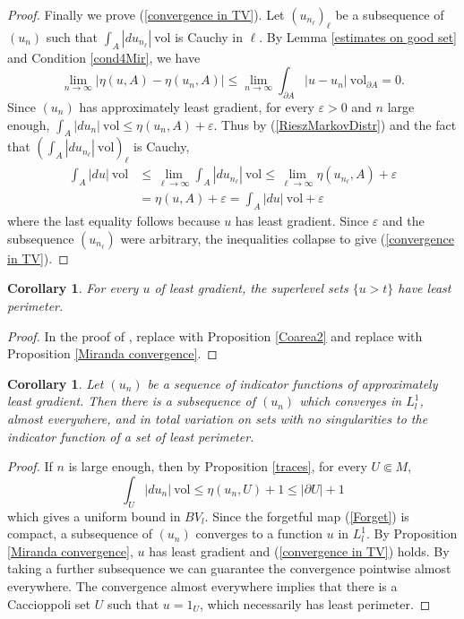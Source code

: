 \documentclass[reqno,12pt,letterpaper]{amsart}
\newcommand{\vol}{\mathrm{vol}}
\newtheorem{corollary}[theorem]{Corollary}
\theoremstyle{definition}
\numberwithin{equation}{section}
\begin{document}
\begin{proof}
Finally we prove (\ref{convergence in TV}).
Let $(u_{n_\ell})_\ell$ be a subsequence of $(u_n)$ such that $\int_A |du_{n_\ell}| ~\vol$ is Cauchy in $\ell$.
By Lemma \ref{estimates on good set} and Condition \ref{cond4Mir}, we have
$$\lim_{n \to \infty} |\eta(u, A) - \eta(u_n, A)| \leq \lim_{n \to \infty} \int_{\partial A} |u - u_n| ~\vol_{\partial A} = 0.$$
Since $(u_n)$ has approximately least gradient, for every $\varepsilon > 0$ and $n$ large enough, $\int_A |du_n| ~\vol \leq \eta(u_n, A) + \varepsilon$.
Thus by (\ref{RieszMarkovDistr}) and the fact that $(\int_A |du_{n_\ell}| ~\vol)_\ell$ is Cauchy,
\begin{align*}
\int_A |du| ~\vol &\leq \lim_{\ell \to \infty} \int_A |du_{n_\ell}| ~\vol \leq \lim_{\ell \to \infty} \eta(u_{n_\ell}, A) + \varepsilon\\
&= \eta(u, A) + \varepsilon = \int_A |du| ~\vol + \varepsilon
\end{align*}
where the last equality follows because $u$ has least gradient.
Since $\varepsilon$ and the subsequence $(u_{n_\ell})$ were arbitrary, the inequalities collapse to give (\ref{convergence in TV}).
\end{proof}

\begin{corollary}\label{level sets are minimal}
For every $u$ of least gradient, the superlevel sets $\{u > t\}$ have least perimeter.
\end{corollary}
\begin{proof}
In the proof of \cite[Theorem 1]{BOMBIERI1969}, replace \cite[Theorem 1.6]{Miranda66} with Proposition \ref{Coarea2} and replace \cite[Theorem 3]{Miranda67} with Proposition \ref{Miranda convergence}.
\end{proof}

\begin{corollary}\label{compactness}
Let $(u_n)$ be a sequence of indicator functions of approximately least gradient.
Then there is a subsequence of $(u_n)$ which converges in $L^1_l$, almost everywhere, and in total variation on sets with no singularities to the indicator function of a set of least perimeter.
\end{corollary}
\begin{proof}
If $n$ is large enough, then by Proposition \ref{traces}, for every $U \Subset M$,
$$\int_U |du_n| ~\vol \leq \eta(u_n, U) + 1 \leq |\partial U| + 1$$
which gives a uniform bound in $BV_l$.
Since the forgetful map (\ref{Forget}) is compact, a subsequence of $(u_n)$ converges to a function $u$ in $L^1_l$.
By Proposition \ref{Miranda convergence}, $u$ has least gradient and (\ref{convergence in TV}) holds.
By taking a further subsequence we can guarantee the convergence pointwise almost everywhere.
The convergence almost everywhere implies that there is a Caccioppoli set $U$ such that $u = 1_U$, which necessarily has least perimeter.
\end{proof}
\end{document}
